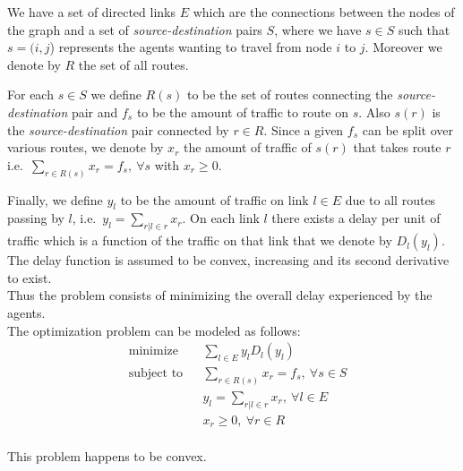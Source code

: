 We have a set of directed links $E$ which are the connections between the nodes of the graph and a set of \textit{source-destination} pairs $S$, where we have $s \in S$ such that $s = (i,j$) represents the agents wanting to travel from node $i$ to $j$. Moreover we denote by $R$ the set of all routes.

For each $s \in S$ we define $R(s)$ to be the set of routes connecting the \textit{source-destination} pair and $f_s$ to be the amount of traffic to route on $s$. Also $s(r)$ is the \textit{source-destination} pair connected by $r \in R$. Since a given $f_s$ can be split over various routes, we denote by $x_r$ the amount of traffic of $s(r)$ that takes route $r$ i.e.\ $\sum\limits_{r \in R(s)}^{} x_r = f_s,\ \forall s$ with $x_r \ge 0$.

Finally, we define $y_l$ to be the amount of traffic on link $l \in E$ due to all routes passing by $l$, i.e.\ $y_l=\sum\limits_{r | l \in r} x_r$. On each link $l$ there exists a delay per unit of traffic which is a function of the traffic on that link that we denote by $D_l(y_l)$. The delay function is assumed to be convex, increasing and its second derivative to exist.\\

Thus the problem consists of minimizing the overall delay experienced by the agents.\\

The optimization problem can be modeled as follows:
\begin{equation}
\begin{aligned}
& {\text{minimize}}
    & &  \sum_{l \in E} y_{l} D_{l}(y_{l}) \\
& \text{subject to}
& & \sum_{r \in R(s)} x_{r} = f_{s},\ \forall s \in S\\
&       & &  y_{l} = \sum\limits_{r|l \in r} x_{r},\ \forall l \in E\\
&      &&  x_{r} \geq 0,\ \forall r \in R\\
\end{aligned}
\label{e:prob}
\end{equation}

This problem happens to be convex.

